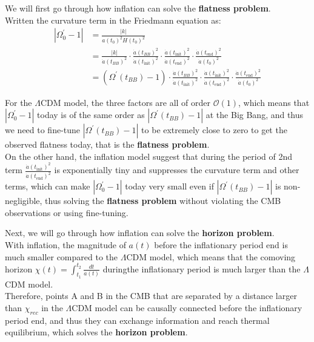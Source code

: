 \clearpage
\begin{foundation}
    We will first go through how inflation can solve the \textbf{flatness problem}. \\

    Written the curvature term in the Friedmann equation as:
    \begin{align*}
        | \Omega_0^{'} - 1 | &= \frac{|k|}{a(t_0)^2 H(t_0)^2} \\
        &= \frac{|k|}{\dot{a}(t_{BB})^2} \cdot \frac{\dot{a}(t_{BB})^2}{\dot{a}(t_{\text{init}})^2} \cdot \frac{\dot{a}(t_{\text{init}})^2}{\dot{a}(t_{\text{end}})^2} \cdot \frac{\dot{a}(t_{\text{end}})^2}{\dot{a}(t_0)^2} \\
        &= (\Omega^{'}(t_{BB}) - 1) \cdot \frac{\dot{a}(t_{BB})^2}{\dot{a}(t_{\text{init}})^2} \cdot \frac{\dot{a}(t_{\text{init}})^2}{\dot{a}(t_{\text{end}})^2} \cdot \frac{\dot{a}(t_{\text{end}})^2}{\dot{a}(t_0)^2}
    \end{align*}

    For the $\Lambda$CDM model, the three factors are all of order $\mathcal{O}(1)$, which means that $| \Omega_0^{'} - 1 |$ today is of the same order as $| \Omega^{'}(t_{BB}) - 1 |$ at the Big Bang, and thus we need to fine-tune $| \Omega^{'}(t_{BB}) - 1 |$ to be extremely close to zero to get the observed flatness today, that is the \textbf{flatness problem}. \\

    On the other hand, the inflation model suggest that during the period of 2nd term $\frac{\dot{a}(t_{\text{init}})^2}{\dot{a}(t_{\text{end}})^2}$ is exponentially tiny and suppresses the curvature term and other terms, which can make $| \Omega_0^{'} - 1 |$ today very small even if $| \Omega^{'}(t_{BB}) - 1 |$ is non-negligible, thus solving the \textbf{flatness problem} without violating the CMB observations or using fine-tuning.
\end{foundation}

\bigskip \noindent
\begin{foundation}
    Next, we will go through how inflation can solve the \textbf{horizon problem}. \\

    With inflation, the magnitude of $a(t)$ before the inflationary period end is much smaller compared to the $\Lambda$CDM model, which means that the comoving horizon $\chi(t) = \int_{t_1}^{t_2} \frac{dt}{a(t)}$ duringthe inflationary period is much larger than the $\Lambda$CDM model. \\
    
    Therefore, points A and B in the CMB that are separated by a distance larger than $\chi_{rec}$ in the $\Lambda$CDM model can be causally connected before the inflationary period end, and thus they can exchange information and reach thermal equilibrium, which solves the \textbf{horizon problem}.
\end{foundation}

